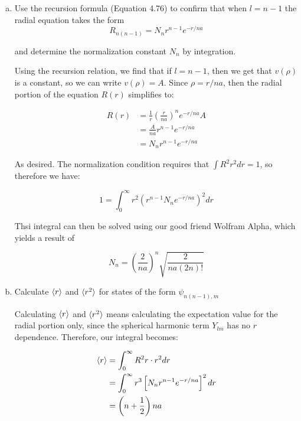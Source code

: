 \documentclass[10pt]{article}
\begin{document}
    \begin{enumerate}[(a)]
        \item Use the recursion formula (Equation 4.76) to confirm that when $l = n-1$ the radial equation takes the form 
        \[ R_{n(n-1)} = N_n r^{n-1} e^{-r/na}\] 

        and determine the normalization constant $N_n$ by integration.


        \begin{solution}
            Using the recursion relation, we find that if $l = n-1$, then we get that $v(\rho)$ is a constant, so we can write $v(\rho) = A$. Since $\rho = r/na$, then the radial portion of the equation $R(r)$ simplifies to: 

            \begin{align*}
                R(r) &= \frac{1}{r} \left(\frac{r}{na}\right)^n e^{-r/na} A \\
                &= \frac{A}{na} r^{n-1} e^{-r/na}\\
                &= N_n r^{n-1}e^{-r/na}
            \end{align*}

            As desired. The normalization condition requires that $\int R^2 r^2 dr = 1$, so therefore we have: 

            \[ 1 = \int_0^\infty r^2\left(r^{n-1} N_n e^{-r/na}\right)^2 dr \] 

            Thsi integral can then be solved using our good friend Wolfram Alpha, which yields a result of 

            \[ N_n = \left(\frac{2}{na}\right)^n \sqrt{\frac{2}{na(2n)!}}\]
        \end{solution}
        \item Calculate $\langle r \rangle$ and $\langle r^2 \rangle$ for states of the form $\psi_{n(n-1), m}$
        
        \begin{solution}
            Calculating $\langle r \rangle$ and $\langle r^2 \rangle$ means calculating the expectation value for the radial portion only, since the spherical harmonic term $Y_{lm}$ has no $r$ dependence. Therefore, our integral becomes:

            \begin{align*}
                \langle r \rangle &= \int_0^\infty R^2 r \cdot r^2 dr \\
                &= \int_0^\infty r^3 \left[N_n r^{n-1} e^{-r/na} \right]^2dr\\
                &= \left(n + \frac 12\right) na
            \end{align*}


\end{solution}
\end{enumerate}
\end{document}
